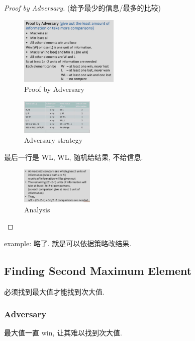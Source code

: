 \begin{proof}[Proof by Adversary] (给予最少的信息/最多的比较)
    \begin{figure}[H]
        \centering
        \includegraphics[width=0.42\textwidth]{pic/DAA2/Proof by Adversaryp1.png}
        \caption{Proof by Adversary}
    \end{figure}
    
    \begin{figure}[H]
        \centering
        \includegraphics[width=0.309\textwidth]{pic/DAA2/Adversary strategy}
        \caption{Adversary strategy}
    \end{figure}
    最后一行是 WL, WL, 随机给结果, 不给信息.

    \begin{figure}[H]
        \centering
        \includegraphics[width=0.309\textwidth]{pic/DAA2/Analysis}
        \caption{Analysis}
    \end{figure}
    
\end{proof}

example: 略了. 就是可以依据策略改结果. 

\subsection{Finding Second Maximum Element}
必须找到最大值才能找到次大值. 

\subsubsection{Adversary}
最大值一直 win, 让其难以找到次大值. 

